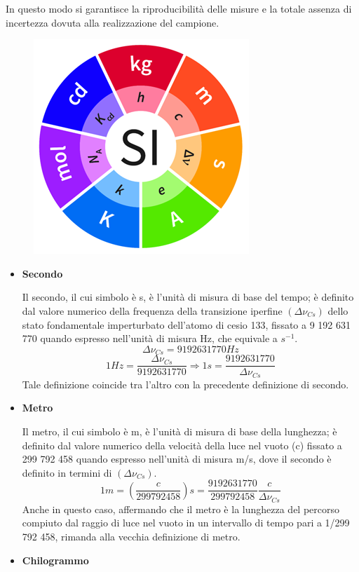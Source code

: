 \documentclass[a4paper, 15pt]{article}
\begin{document}
\begin{adjustwidth}{2in}{}
	In questo modo si garantisce la riproducibilità delle misure e la totale assenza di incertezza dovuta alla realizzazione del campione.
	
\begin{figure}[H]
	\centering
	\includegraphics[width=0.5\linewidth]{fig/screenshot002}
	\label{fig:screenshot002}
\end{figure}


	\begin{itemize}
		\item \textbf{Secondo} 
		
		Il secondo, il cui simbolo è s, è l'unità di misura di base del tempo; è definito dal valore numerico della frequenza della transizione iperfine $(\Delta\nu_{Cs})$ dello stato fondamentale imperturbato dell'atomo di cesio 133, fissato a 9 192 631 770 quando espresso nell'unità di misura Hz, che equivale a $s^{-1}$.
		\[ \Delta\nu_{Cs} = 9 192 631 770 Hz \]
		\[ 1 Hz = \dfrac{\Delta\nu_{Cs}}{9 192 631 770} \Rightarrow 1 s = \dfrac{9 192 631 770}{\Delta\nu_{Cs}} \]
		Tale definizione coincide tra l'altro con la precedente definizione di secondo.
		
		\item \textbf{Metro} 
		
		Il metro, il cui simbolo è m, è l'unità di misura di base della lunghezza; è definito dal valore numerico della velocità della luce nel vuoto (c) fissato a 299 792 458 quando espresso nell'unità di misura m/s, dove il secondo è definito in termini di $(\Delta\nu_{Cs})$. 
		\[1m = \left( \dfrac{c}{299 792 458}\right)s = \dfrac{ 9 192 631 770}{299 792 458}\dfrac{c}{\Delta\nu_{Cs}} \]
		Anche in questo caso, affermando che il metro è la lunghezza del percorso compiuto dal raggio di luce nel vuoto in un intervallo di tempo pari a 1/299 792 458, rimanda alla vecchia definizione di metro.
		
		\item \textbf{Chilogrammo} 
		 

\end{itemize}
\end{adjustwidth}
\end{document}
